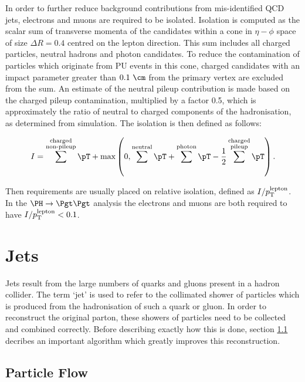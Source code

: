 In order to further reduce background contributions from mis-identified \ac{QCD} jets,
electrons and muons are required to be isolated. Isolation is computed as the
scalar sum of transverse momenta of the candidates within a cone in
$\eta-\phi$ space of size $\Delta R = 0.4$ centred on the lepton direction. 
This sum includes all charged particles, neutral hadrons and photon candidates. 
To reduce the contamination of particles which originate from \ac{PU} events 
in this cone, charged  candidates with an impact parameter greater than 
$0.1~\cm$ from the primary vertex are excluded from the sum. An estimate of the 
neutral pileup contribution is made based on the charged pileup contamination,
multiplied by a factor 0.5, which is approximately the ratio of neutral to
charged components of the hadronisation, as determined from simulation.   
The isolation is then defined as follows:

\begin{equation}
I = \sum^{\substack{\text{charged} \\ \text{non-pileup}}}\pT +
\text{max}\left(0,\sum^{\text{neutral}}\pT+\sum^{\text{photon}}\pT-\frac{1}{2}\sum^{\substack{\text{charged}
\\ \text{pileup}}}\pT\right).
\end{equation}

Then requirements are usually placed on relative isolation, defined as
$I / p_{\mathrm{T}}^{\text{lepton}}$. In the $\PH\to\Pgt\Pgt$ analysis the electrons and
muons are both required to have $I / p_{\mathrm{T}}^{\text{lepton}} < 0.1$. 

\section{Jets}
\label{sec:jets}

Jets result from the large numbers of quarks and gluons present in a hadron
collider. The term `jet' is used to refer to the collimated shower of particles
which is produced from the hadronisation of such a quark or gluon. In order to
reconstruct the original parton, these showers of particles need to be collected
and combined correctly. Before describing exactly how this is done, section
\ref{sec:particleflow} decribes an important algorithm which greatly improves
this reconstruction. 

\subsection{Particle Flow}
\label{sec:particleflow}

